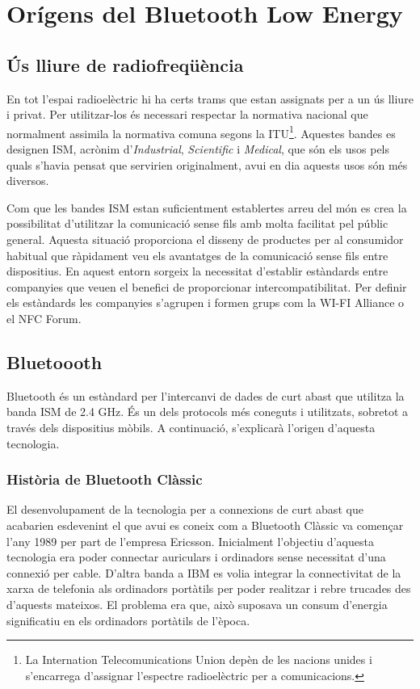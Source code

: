 \chapter{Orígens del Bluetooth Low Energy}\label{C:compaginacio}

\section{Ús lliure de radiofreqüència}
En tot l'espai radioelèctric hi ha certs trams que estan assignats per a un ús lliure i privat.
Per utilitzar-los és necessari respectar la normativa nacional que normalment assimila la normativa comuna segons la ITU\footnote{La Internation Telecomunications Union depèn de les nacions unides i s'encarrega d'assignar l'espectre radioelèctric per a comunicacions.}.
Aquestes bandes es designen ISM, acrònim d'\textit{Industrial}, \textit{Scientific} i \textit{Medical}, que són els usos pels quals s'havia pensat que servirien originalment, avui en dia aquests usos són més diversos.

Com que les bandes ISM estan suficientment establertes arreu del món es crea la possibilitat d'utilitzar la comunicació sense fils amb molta facilitat pel públic general.
Aquesta situació proporciona el disseny de productes per al consumidor habitual que ràpidament veu els avantatges de la comunicació sense fils entre dispositius.
En aquest entorn sorgeix la necessitat d'establir estàndards entre companyies que veuen el benefici de proporcionar intercompatibilitat.
Per definir els estàndards les companyies s'agrupen i formen grups com la WI-FI Alliance o el NFC Forum.

\section{Bluetoooth}
Bluetooth és un estàndard per l'intercanvi de dades de curt abast que utilitza la banda ISM de 2.4 GHz.
És un dels protocols més coneguts i utilitzats, sobretot a través dels dispositius mòbils.
A continuació, s'explicarà l'origen d'aquesta tecnologia.

\subsection{Història de Bluetooth Clàssic}
El desenvolupament de la tecnologia per a connexions de curt abast que acabarien esdevenint el que avui es coneix com a Bluetooth Clàssic va començar l'any 1989 per part de l'empresa Ericsson.
Inicialment l'objectiu d'aquesta tecnologia era poder connectar auriculars i ordinadors sense necessitat d'una connexió per cable.
D'altra banda a IBM es volia integrar la connectivitat de la xarxa de telefonia als ordinadors portàtils per poder realitzar i rebre trucades des d'aquests mateixos.
El problema era que, això suposava un consum d'energia significatiu en els ordinadors portàtils de l'època.

